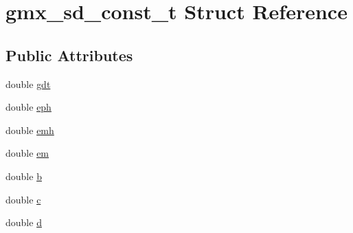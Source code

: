 \hypertarget{structgmx__sd__const__t}{\section{gmx\-\_\-sd\-\_\-const\-\_\-t \-Struct \-Reference}
\label{structgmx__sd__const__t}
}
\subsection*{\-Public \-Attributes}
\begin{DoxyCompactItemize}
\item 
double \hyperlink{structgmx__sd__const__t_a96ac302f96392f0a61555cb38fad03c2}{gdt}
\item 
double \hyperlink{structgmx__sd__const__t_a97ba66f46e4cdcd99ccd400bb2b7bc4e}{eph}
\item 
double \hyperlink{structgmx__sd__const__t_aa83e1586e0ad32b60a0727f49516891e}{emh}
\item 
double \hyperlink{structgmx__sd__const__t_aa9872f03aa048a2eb136c2fd09f75fea}{em}
\item 
double \hyperlink{structgmx__sd__const__t_a6e097df68d8603a7c83f6e13b1d3ecc5}{b}
\item 
double \hyperlink{structgmx__sd__const__t_a5f0b22f68a4a40fe3f423ba69b72e876}{c}
\item 
double \hyperlink{structgmx__sd__const__t_a9fd17acbbefd6557203d05527e388676}{d}
\end{DoxyCompactItemize}


